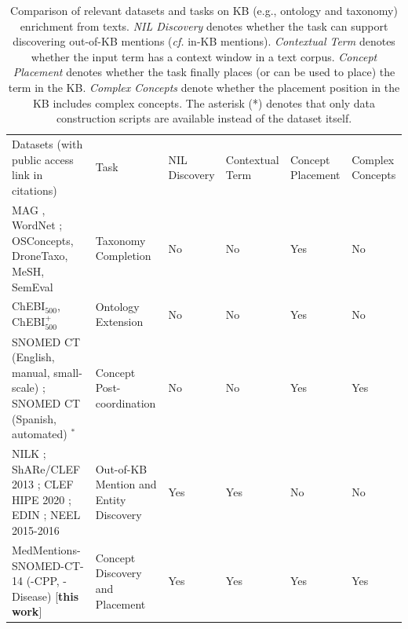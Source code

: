 \documentclass[sigconf]{acmart}
\begin{document}
	\begin{table}[ht]
		\small
		\caption{Comparison of relevant datasets and tasks on KB (e.g., ontology and taxonomy) enrichment from texts. \textit{NIL Discovery} denotes whether the task can support discovering out-of-KB mentions (\textit{cf.} in-KB mentions). \textit{Contextual Term} denotes whether the input term has a context window in a text corpus. \textit{Concept Placement} denotes whether the task finally places (or can be used to place) the term in the KB. \textit{Complex Concepts} denote whether the placement position in the KB includes complex concepts. The asterisk (*) denotes that only data construction scripts are available instead of the dataset itself. }\label{dataset-summary}
		\vspace{-0.2cm}
		\begin{tabular}{p{5.2cm}p{2.4cm}|llll}
			\cline{1-6}
			Datasets (with public access link in citations) & Task                & NIL Discovery & Contextual Term  & Concept Placement  & Complex Concepts \\
			\cline{1-6}
			MAG
			, WordNet 
			\cite{zhang2021TMN,Shen2020TaxoExpan,jurgens-pilehvar-2016-semeval}; OSConcepts, DroneTaxo, MeSH, SemEval 
			\cite{Zeng2021,Wang2022QEN}                     & Taxonomy Completion                              & No                 & No                & Yes & No                  \\ 
			\cline{1-6}
			ChEBI$_{500}$, ChEBI$^+_{500}$ \cite{glauer2022interpretable} & Ontology Extension
			& No                 & No & Yes & No                  \\ \cline{1-6}
			SNOMED CT (English, manual, small-scale) \cite{kate2020}; SNOMED CT (Spanish, automated) \cite{castell2023postcoordination}$^*$                     & Concept Post-coordination                        &   No                 & No   & Yes               & Yes                  \\ 
			\cline{1-6}
			NILK \cite{Iurshina2022nilk}; ShARe/CLEF 2013 \cite{suominen2013shareclef}; CLEF HIPE 2020 \cite{ehrmann2020extended}; EDIN \cite{kassner2022edin}; NEEL 2015-2016 \cite{rizzo2015neel,rizzo2016neel}
			& Out-of-KB Mention and Entity Discovery &   Yes              & Yes  & No                & No                   \\
			\hline\hline 
			MedMentions-SNOMED-CT-14 (-CPP, -Disease) [\textbf{this work}]                     & Concept Discovery and Placement                             &  Yes                & Yes               & Yes  & Yes                
			\\
			\cline{1-6}
		\end{tabular}
	\end{table}
	
\end{document}
